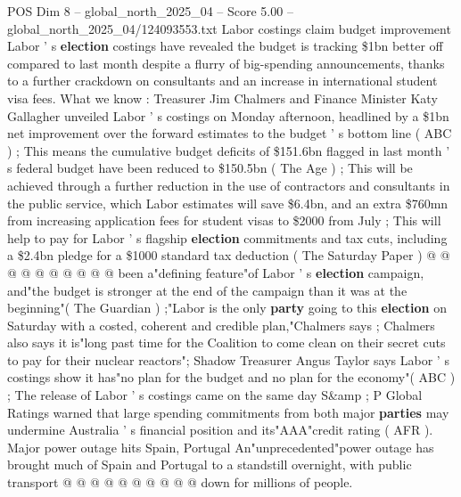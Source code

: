 \begin{textsample}{POS Dim 8 – global\_north\_2025\_04 – Score 5.00 – global\_north\_2025\_04/124093553.txt}  \label{ex:f8_pos_378}
Labor costings claim budget improvement Labor ' s \textbf{election} costings have revealed the budget is tracking \$1bn better off compared to last month despite a flurry of big-spending announcements, thanks to a further crackdown on consultants and an increase in international student visa fees.
What we know : Treasurer Jim Chalmers and Finance Minister Katy Gallagher unveiled Labor ' s costings on Monday afternoon, headlined by a \$1bn net improvement over the forward estimates to the budget ' s bottom line ( ABC ) ; This means the cumulative budget deficits of \$151.6bn flagged in last month ' s federal budget have been reduced to \$150.5bn ( The Age ) ; This will be achieved through a further reduction in the use of contractors and consultants in the public service, which Labor estimates will save \$6.4bn, and an extra \$760mn from increasing application fees for student visas to \$2000 from July ; This will help to pay for Labor ' s flagship \textbf{election} commitments and tax cuts, including a \$2.4bn pledge for a \$1000 standard tax deduction ( The Saturday Paper ) @ @ @ @ @ @ @ @ @ @ been a"defining feature"of Labor ' s \textbf{election} campaign, and"the budget is stronger at the end of the campaign than it was at the beginning"( The Guardian ) ;"Labor is the only \textbf{party} going to this \textbf{election} on Saturday with a costed, coherent and credible plan,"Chalmers says ; Chalmers also says it is"long past time for the Coalition to come clean on their secret cuts to pay for their nuclear reactors"; Shadow Treasurer Angus Taylor says Labor ' s costings show it has"no plan for the budget and no plan for the economy"( ABC ) ; The release of Labor ' s costings came on the same day S\&amp ; P Global Ratings warned that large spending commitments from both major \textbf{parties} may undermine Australia ' s financial position and its"AAA"credit rating ( AFR ).
Major power outage hits Spain, Portugal An"unprecedented"power outage has brought much of Spain and Portugal to a standstill overnight, with public transport @ @ @ @ @ @ @ @ @ @ down for millions of people.

\end{textsample}
